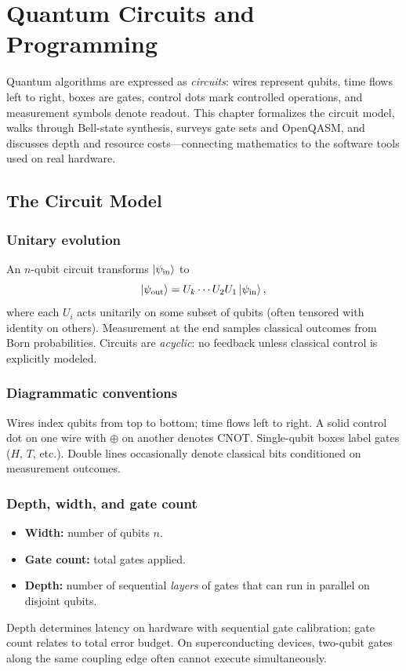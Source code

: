 \chapter{Quantum Circuits and Programming}
\label{ch:circuits}

Quantum algorithms are expressed as \emph{circuits}: wires represent qubits, time flows left to right, boxes are gates, control dots mark controlled operations, and measurement symbols denote readout. This chapter formalizes the circuit model, walks through Bell-state synthesis, surveys gate sets and OpenQASM, and discusses depth and resource costs---connecting mathematics to the software tools used on real hardware.

\section{The Circuit Model}
\label{sec:circuit-model}

\subsection{Unitary evolution}

An $n$-qubit circuit transforms $\ket{\psi_{\mathrm{in}}}$ to
\begin{equation}
\ket{\psi_{\mathrm{out}}}=U_k\cdots U_2 U_1\ket{\psi_{\mathrm{in}}},
\label{eq:circuit-evolution}
\end{equation}
where each $U_i$ acts unitarily on some subset of qubits (often tensored with identity on others). Measurement at the end samples classical outcomes from Born probabilities. Circuits are \emph{acyclic}: no feedback unless classical control is explicitly modeled.

\subsection{Diagrammatic conventions}

Wires index qubits from top to bottom; time flows left to right. A solid control dot on one wire with $\oplus$ on another denotes CNOT. Single-qubit boxes label gates ($H$, $T$, etc.). Double lines occasionally denote classical bits conditioned on measurement outcomes.

\subsection{Depth, width, and gate count}

\begin{itemize}[noitemsep]
\item \textbf{Width:} number of qubits $n$.
\item \textbf{Gate count:} total gates applied.
\item \textbf{Depth:} number of sequential \emph{layers} of gates that can run in parallel on disjoint qubits.
\end{itemize}
Depth determines latency on hardware with sequential gate calibration; gate count relates to total error budget. On superconducting devices, two-qubit gates along the same coupling edge often cannot execute simultaneously.

